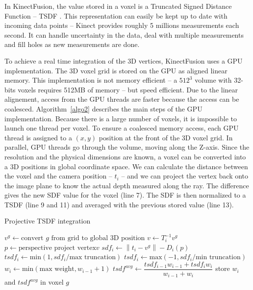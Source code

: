 \documentclass[12pt]{article}
\begin{document}
In KinectFusion, the value stored in a voxel is a Truncated Signed Distance Function -- TSDF \cite{VolRep}. This representation can easily be kept up to date with incoming data points -- Kinect provides roughly 5 millions measurements each second. It can handle uncertainty in the data, deal with multiple measurements and fill holes as new measurements are done.

To achieve a real time integration of the 3D vertices, KinectFusion uses a GPU implementation. The 3D voxel grid is stored on the GPU as aligned linear memory. This implementation is not memory efficient -- a $512^3$ volume with 32-bits voxels requires 512MB of memory -- but speed efficient. Due to the linear alignement, access from the GPU threads are faster because the access can be coalesced. Algorithm~\ref{algo2} describes the main steps of the GPU implementation. Because there is a large number of voxels, it is impossible to launch one thread per voxel. To ensure a coalesced memory access, each GPU thread is assigned to a $(x,y)$ position at the front of the 3D voxel grid. In parallel, GPU threads go through the volume, moving along the Z-axis. Since the resolution and the physical dimensions are known, a voxel can be converted into a 3D positions in global coordinate space. We can calculate the distance between the voxel and the camera position -- $t_i$ -- and we can project the vertex back onto the image plane to know the actual depth measured along the ray. The difference gives the new SDF value for the voxel (line 7). The SDF is then normalized to a TSDF (line 9 and 11) and averaged with the previous stored value (line 13).

\begin{algorithm}
\caption{Projective TSDF integration}\label{algo2}
\begin{algorithmic}[1]
  \State $v^g \gets \text{convert }g\text{ from grid to global 3D position}$
  \State $v \gets T_i^{-1}v^g$
  \State $p \gets \text{perspective project vertex} v$
    \State $sdf_i \gets \left\|t_i-v^{g}\right\| - D_i(p)$
      \State $tsdf_i \gets \text{min}(1, sdf_i/\text{max truncation})$
      \Else
      \State $tsdf_i \gets \text{max}(-1, sdf_i/\text{min truncation})$
      \EndIf
    \State $w_i \gets \text{min}(\text{max weight}, w_{i-1}+1)$
    \State $tsdf^{avg} \gets \dfrac{tsdf_{i-1}w_{i-1}+tsdf_iw_i}{w_{i-1}+w_i}$
    \State store $w_i$ and $tsdf^{avg}$ in voxel $g$
    \EndIf
  \EndWhile
\EndFor
\end{algorithmic}
\end{algorithm}
\end{document}
